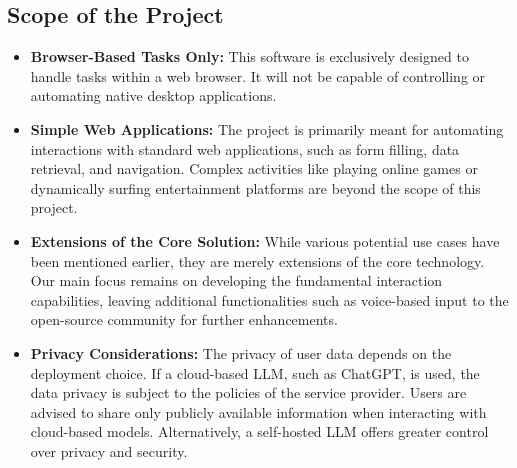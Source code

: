 \documentclass[conference]{IEEEtran}
\begin{document}
\subsection{Scope of the Project}
\begin{itemize}
    \item \textbf{Browser-Based Tasks Only:} This software is exclusively designed to handle tasks within a web browser. It will not be capable of controlling or automating native desktop applications.
    \item \textbf{Simple Web Applications:} The project is primarily meant for automating interactions with standard web applications, such as form filling, data retrieval, and navigation. Complex activities like playing online games or dynamically surfing entertainment platforms are beyond the scope of this project.
    \item \textbf{Extensions of the Core Solution:} While various potential use cases have been mentioned earlier, they are merely extensions of the core technology. Our main focus remains on developing the fundamental interaction capabilities, leaving additional functionalities such as voice-based input to the open-source community for further enhancements.
    \item \textbf{Privacy Considerations:} The privacy of user data depends on the deployment choice. If a cloud-based LLM, such as ChatGPT, is used, the data privacy is subject to the policies of the service provider. Users are advised to share only publicly available information when interacting with cloud-based models. Alternatively, a self-hosted LLM offers greater control over privacy and security.
\end{itemize}
\end{document}
